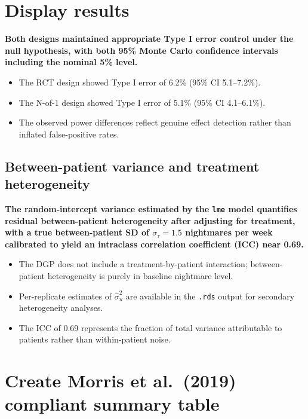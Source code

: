 \documentclass[
  11pt,
]{article}
\begin{document}
\section{Display results}\label{display-results}

\textbf{Both designs maintained appropriate Type I error control under the null hypothesis, with both 95\% Monte Carlo confidence intervals including the nominal 5\% level.}

\begin{itemize}\setlength{\itemsep}{2pt}\setlength{\parskip}{0pt}
\item The RCT design showed Type I error of 6.2\% (95\% CI 5.1--7.2\%).
\item The N-of-1 design showed Type I error of 5.1\% (95\% CI 4.1--6.1\%).
\item The observed power differences reflect genuine effect detection rather than inflated false-positive rates.
\end{itemize}

\subsection{Between-patient variance and treatment heterogeneity}\label{between-patient-variance-and-treatment-heterogeneity}

\textbf{The random-intercept variance estimated by the \texttt{lme} model quantifies residual between-patient heterogeneity after adjusting for treatment, with a true between-patient SD of $\sigma_\tau = 1.5$ nightmares per week calibrated to yield an intraclass correlation coefficient (ICC) near 0.69.}

\begin{itemize}\setlength{\itemsep}{2pt}\setlength{\parskip}{0pt}
\item The DGP does not include a treatment-by-patient interaction; between-patient heterogeneity is purely in baseline nightmare level.
\item Per-replicate estimates of $\hat{\sigma}_u^2$ are available in the \texttt{.rds} output for secondary heterogeneity analyses.
\item The ICC of 0.69 represents the fraction of total variance attributable to patients rather than within-patient noise.
\end{itemize}

\section{Create Morris et al.~(2019) compliant summary table}\label{create-morris-et-al.-2019-compliant-summary-table}
\end{document}
